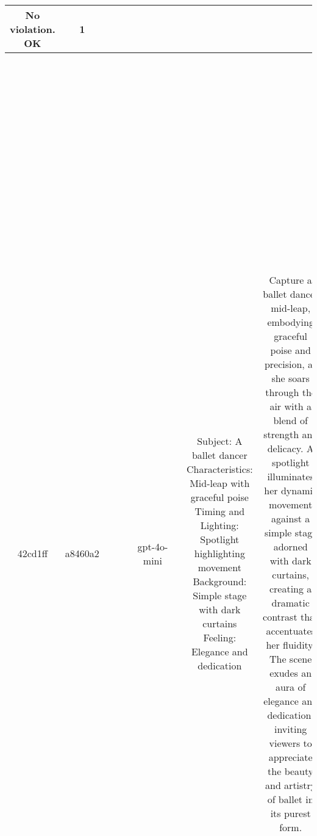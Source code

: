 \begin{table}[h!]
\begin{tabular}{|c|c|c|c|c|c|c|c|c|c|}
No violation.
OK & 1\\
\hline
42cd1ff & a8460a2 &  &  & gpt-4o-mini & Subject: A ballet dancer  
Characteristics: Mid-leap with graceful poise  
Timing and Lighting: Spotlight highlighting movement  
Background: Simple stage with dark curtains  
Feeling: Elegance and dedication & Capture a ballet dancer mid-leap, embodying graceful poise and precision, as she soars through the air with a blend of strength and delicacy. A spotlight illuminates her dynamic movement against a simple stage adorned with dark curtains, creating a dramatic contrast that accentuates her fluidity. The scene exudes an aura of elegance and dedication, inviting viewers to appreciate the beauty and artistry of ballet in its purest form. & ok & The chatbot output is concise and contained within a single paragraph, meeting the requirement of not exceeding 80 words. It begins by focusing on the subject, a ballet dancer, describing her characteristics such as "graceful poise," "precision," "strength," and "delicacy." It then details the timing and lighting with "mid-leap" and "a spotlight," which properly illuminates the subject. The background is described as a "simple stage adorned with dark curtains," creating a "dramatic contrast," which complies with the need to describe these elements. Finally, the output conveys the feeling the image should evoke with "an aura of elegance and dedication." Each step prescribed by the description is followed, and the language is artistic and precise, aiming to create an impactful AI-generated photo.

OK & 1\\
\hline
42cd1ff & a8460a2 &  &  & gemma2:9b & Subject: A ballet dancer  
Characteristics: Mid-leap with graceful poise  
Timing and Lighting: Spotlight highlighting movement  
Background: Simple stage with dark curtains  
Feeling: Elegance and dedication & A ballerina mid-leap, her body flowing with effortless grace and power as she soars through the air. A single spotlight illuminates her every move, casting sharp shadows from her limbs against the backdrop of darkened velvet curtains on a bare stage. The scene evokes an image both elegant and dedicated, capturing the pure essence of ballet's artistry and unwavering commitment.


 & ok & The chatbot output describes a single paragraph visual depiction of a ballerina mid-leap. It mentions the subject and its characteristics: "A ballerina mid-leap, her body flowing with effortless grace and power." It includes details on timing and lighting: "A single spotlight illuminates her every move, casting sharp shadows." It describes the background: "darkened velvet curtains on a bare stage." Lastly, it conveys the feeling the image should evoke: "an image both elegant and dedicated, capturing the pure essence of ballet's artistry and unwavering commitment." The description doesn't exceed 80 words and is in English. All specified elements are present according to the guidelines in the description.


\end{tabular}
\end{table}
